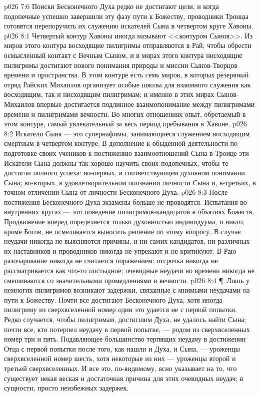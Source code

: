 \vs p026 7:6 Поиски Бесконечного Духа редко не достигают цели, и когда подопечные успешно завершили эту фазу пути к Божеству, проводники Троицы готовятся перепоручить их служению искателей Сына в четвертом круге Хавоны.
\vs p026 8:1 Четвертый контур Хавоны иногда называют <<контуром Сынов>>. Из миров этого контура восходящие пилигримы отправляются в Рай, чтобы обрести осмысленный контакт с Вечным Сыном, и в мирах этого контура нисходящие пилигримы достигают нового понимания природы и миссии Сынов\hyp{}Творцов времени и пространства. В этом контуре есть семь миров, в которых резервный отряд Райских Михаилов организует особые школы для взаимного служения как восходящим, так и нисходящим пилигримам; и именно в этих мирах Сынов\hyp{}Михаилов впервые достигается подлинное взаимопонимание между пилигримами времени и пилигримами вечности. Во многих отношениях опыт, обретаемый в этом контуре, самый увлекательный за весь период пребывания в Хавоне.
\vs p026 8:2 Искатели Сына --- это супернафимы, занимающиеся служением восходящим смертным в четвертом контуре. В дополнение к обыденной деятельности по подготовке своих учеников к постижению взаимоотношений Сына в Троице эти Искатели Сына должны так хорошо научить своих подопечных, чтобы те достигли полного успеха: во\hyp{}первых, в соответствующем духовном понимании Сына; во\hyp{}вторых, в удовлетворительном опознании личности Сына и, в\hyp{}третьих, в точном отличении Сына от личности Бесконечного Духа.
\vs p026 8:3 После постижения Бесконечного Духа экзамены больше не проводятся. Испытания во внутренних кругах --- это поведение пилигримов\hyp{}кандидатов в объятиях Божеств. Продвижение вперед определяется только духовностью индивидуума, и никто, кроме Богов, не осмеливается выносить решение по этому вопросу. В случае неудачи никогда не выясняются причины, и ни самих кандидатов, ни различных их наставников и проводников никогда не упрекают и не критикуют. В Раю разочарование никогда не считается поражением; отсрочка никогда не рассматривается как что\hyp{}то постыдное; очевидные неудачи во времени никогда не смешиваются со значительными промедлениями в вечности.
\vs p026 8:4 \P\ Лишь у немногих пилигримов возникают задержки, связанные с мнимыми неудачами на пути к Божеству. Почти все достигают Бесконечного Духа, хотя иногда пилигриму из сверхвселенной номер один это удается не с первой попытки. Редко случается, чтобы пилигримам, достигшим Духа, не удалось найти Сына; почти все, кто потерпел неудачу в первой попытке, --- родом из сверхвселенных номер три и пять. Подавляющее большинство терпящих неудачу в достижении Отца с первой попытки после того, как нашли и Духа, и Сына, --- уроженцы сверхвселенной номер шесть, хотя некоторые из них --- уроженцы второй и третьей сверхвселенных. И все это, по\hyp{}видимому, ясно указывает на то, что существует некая веская и достаточная причина для этих очевидных неудач; в сущности, просто неизбежных задержек.
